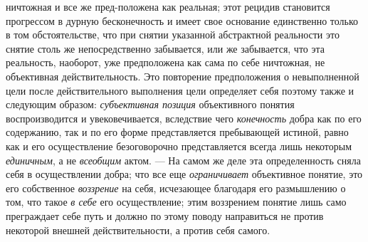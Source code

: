 \documentclass[twoside]{article}
\begin{document}
ничтожная и все же пред-положена как реальная; этот рецидив становится
прогрессом в дурную бесконечность и имеет свое основание единственно только
в том обстоятельстве, что при снятии указанной абстрактной реальности это
снятие столь же непосредственно забывается, или же забывается, что эта
реальность, наоборот, уже предположена как сама по себе ничтожная, не
объективная действительность. Это повторение предположения о невыполненной
цели после действительного выполнения цели определяет себя поэтому также и
следующим образом: {\em субъективная
позиция} объективного понятия воспроизводится и
увековечивается, вследствие чего
{\em конечность} добра
как по его содержанию, так и по его форме представляется
пребывающей истиной, равно как и его осуществление безоговорочно
представляется всегда лишь некоторым
{\em единичным}, а не
{\em всеобщим} актом. —
На самом же деле эта определенность сняла себя в
осуществлении добра; что все еще
{\em ограничивает}
объективное понятие, это его собственное
{\em воззрение} на себя,
исчезающее благодаря его размышлению о том, что такое
{\em в себе} его
осуществление; этим воззрением понятие лишь само преграждает себе путь и
должно по этому поводу направиться не против некоторой внешней
действительности, а против себя самого.
\end{document}
